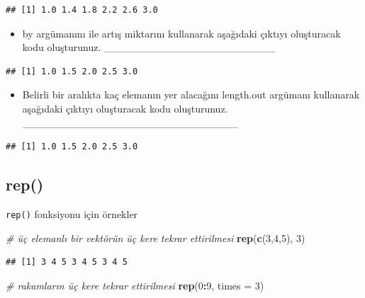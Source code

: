 \documentclass[
  oneside]{book}
\newenvironment{Shaded}{\begin{snugshade}}{\end{snugshade}}
\newcommand{\AttributeTok}[1]{\textcolor[rgb]{0.13,0.29,0.53}{#1}}
\newcommand{\CommentTok}[1]{\textcolor[rgb]{0.56,0.35,0.01}{\textit{#1}}}
\newcommand{\DecValTok}[1]{\textcolor[rgb]{0.00,0.00,0.81}{#1}}
\newcommand{\FunctionTok}[1]{\textcolor[rgb]{0.13,0.29,0.53}{\textbf{#1}}}
\newcommand{\NormalTok}[1]{#1}
\newcommand{\SpecialCharTok}[1]{\textcolor[rgb]{0.81,0.36,0.00}{\textbf{#1}}}
\providecommand{\tightlist}{%
  \setlength{\itemsep}{0pt}\setlength{\parskip}{0pt}}
\begin{document}
\begin{verbatim}
## [1] 1.0 1.4 1.8 2.2 2.6 3.0
\end{verbatim}

\begin{itemize}
\tightlist
\item
  by argümanını ile artış miktarını kullanarak aşağıdaki çıktıyı oluşturacak kodu oluşturunuz. \_\_\_\_\_\_\_\_\_\_\_\_\_\_\_\_\_\_\_\_\_\_\_
\end{itemize}

\begin{verbatim}
## [1] 1.0 1.5 2.0 2.5 3.0
\end{verbatim}

\begin{itemize}
\tightlist
\item
  Belirli bir aralıkta kaç elemanın yer alacağını length.out argümanı kullanarak aşağıdaki çıktıyı oluşturacak kodu oluşturunuz. \_\_\_\_\_\_\_\_\_\_\_\_\_\_\_\_\_\_\_\_\_\_\_\_\_\_\_\_\_
\end{itemize}

\begin{verbatim}
## [1] 1.0 1.5 2.0 2.5 3.0
\end{verbatim}

\hypertarget{rep}{%
\subsection{rep()}\label{rep}}

\texttt{rep()} fonksiyonu için örnekler

\begin{Shaded}
\begin{Highlighting}[]
\CommentTok{\# üç elemanlı bir vektörün üç kere tekrar ettirilmesi}
\FunctionTok{rep}\NormalTok{(}\FunctionTok{c}\NormalTok{(}\DecValTok{3}\NormalTok{,}\DecValTok{4}\NormalTok{,}\DecValTok{5}\NormalTok{), }\DecValTok{3}\NormalTok{)}
\end{Highlighting}
\end{Shaded}

\begin{verbatim}
## [1] 3 4 5 3 4 5 3 4 5
\end{verbatim}

\begin{Shaded}
\begin{Highlighting}[]
\CommentTok{\# rakamların üç kere tekrar ettirilmesi}
\FunctionTok{rep}\NormalTok{(}\DecValTok{0}\SpecialCharTok{:}\DecValTok{9}\NormalTok{, }\AttributeTok{times =} \DecValTok{3}\NormalTok{) }
\end{Highlighting}
\end{Shaded}
\end{document}
